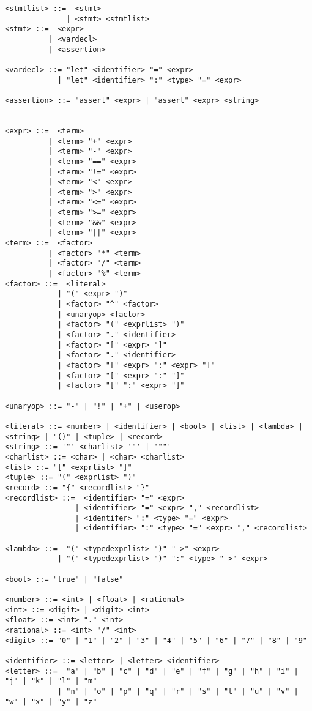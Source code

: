\begin{verbatim}
<stmtlist> ::=  <stmt> 
              | <stmt> <stmtlist>
<stmt> ::=  <expr> 
          | <vardecl>
          | <assertion>
          
<vardecl> ::= "let" <identifier> "=" <expr>
            | "let" <identifier> ":" <type> "=" <expr>
            
<assertion> ::= "assert" <expr> | "assert" <expr> <string>
                

<expr> ::=  <term> 
          | <term> "+" <expr> 
          | <term> "-" <expr>
          | <term> "==" <expr>
          | <term> "!=" <expr>
          | <term> "<" <expr>
          | <term> ">" <expr>
          | <term> "<=" <expr>
          | <term> ">=" <expr>
          | <term> "&&" <expr>
          | <term> "||" <expr>
<term> ::=  <factor> 
          | <factor> "*" <term> 
          | <factor> "/" <term> 
          | <factor> "%" <term> 
<factor> ::=  <literal> 
            | "(" <expr> ")" 
            | <factor> "^" <factor>
            | <unaryop> <factor>
            | <factor> "(" <exprlist> ")"
            | <factor> "." <identifier>
            | <factor> "[" <expr> "]"
            | <factor> "." <identifier>
            | <factor> "[" <expr> ":" <expr> "]"
            | <factor> "[" <expr> ":" "]"
            | <factor> "[" ":" <expr> "]"

<unaryop> ::= "-" | "!" | "+" | <userop>

<literal> ::= <number> | <identifier> | <bool> | <list> | <lambda> | <string> | "()" | <tuple> | <record>
<string> ::= '"' <charlist> '"' | '""'
<charlist> ::= <char> | <char> <charlist>
<list> ::= "[" <exprlist> "]"
<tuple> ::= "(" <exprlist> ")"
<record> ::= "{" <recordlist> "}"
<recordlist> ::=  <identifier> "=" <expr> 
                | <identifier> "=" <expr> "," <recordlist>
                | <identifer> ":" <type> "=" <expr> 
                | <identifier> ":" <type> "=" <expr> "," <recordlist>
            
<lambda> ::=  "(" <typedexprlist> ")" "->" <expr>
            | "(" <typedexprlist> ")" ":" <type> "->" <expr>

<bool> ::= "true" | "false"
            
<number> ::= <int> | <float> | <rational>
<int> ::= <digit> | <digit> <int>
<float> ::= <int> "." <int>
<rational> ::= <int> "/" <int>
<digit> ::= "0" | "1" | "2" | "3" | "4" | "5" | "6" | "7" | "8" | "9"

<identifier> ::= <letter> | <letter> <identifier>
<letter> ::=  "a" | "b" | "c" | "d" | "e" | "f" | "g" | "h" | "i" | "j" | "k" | "l" | "m" 
            | "n" | "o" | "p" | "q" | "r" | "s" | "t" | "u" | "v" | "w" | "x" | "y" | "z"


\end{verbatim}
